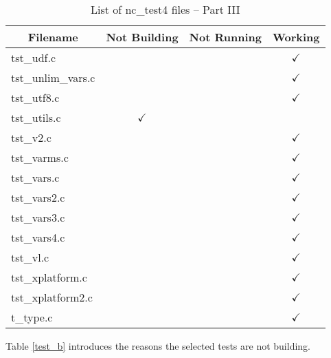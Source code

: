 \begin{table}[H]
\centering
\begin{tabular}{|l|c|c|c|}
\hline
\multicolumn{1}{c|}{\parbox{6cm}{\centering Filename}} & \multicolumn{1}{c|}{Not Building} & \multicolumn{1}{c|}{Not Running} & \multicolumn{1}{c|}{Working} \\ \hline \hline
tst\_udf.c              &               &               & $\checkmark$    \\ \hline
tst\_unlim\_vars.c      &               &               & $\checkmark$    \\ \hline
tst\_utf8.c             &               &               & $\checkmark$    \\ \hline
tst\_utils.c            & $\checkmark$  &               &                 \\ \hline
tst\_v2.c               &               &               & $\checkmark$    \\ \hline
tst\_varms.c            &               &               & $\checkmark$    \\ \hline
tst\_vars.c             &               &               & $\checkmark$    \\ \hline
tst\_vars2.c            &               &               & $\checkmark$    \\ \hline
tst\_vars3.c            &               &               & $\checkmark$    \\ \hline
tst\_vars4.c            &               &               & $\checkmark$    \\ \hline
tst\_vl.c               &               &               & $\checkmark$    \\ \hline
tst\_xplatform.c        &               &               & $\checkmark$    \\ \hline
tst\_xplatform2.c       &               &               & $\checkmark$    \\ \hline
t\_type.c               &               &               & $\checkmark$    \\ \hline
\hline
\end{tabular}
\caption{\label{tab:nc_test4_3} List of nc\_test4 files -- Part III}
\end{table}

Table \ref{test_b} introduces the reasons the selected tests are not building.

